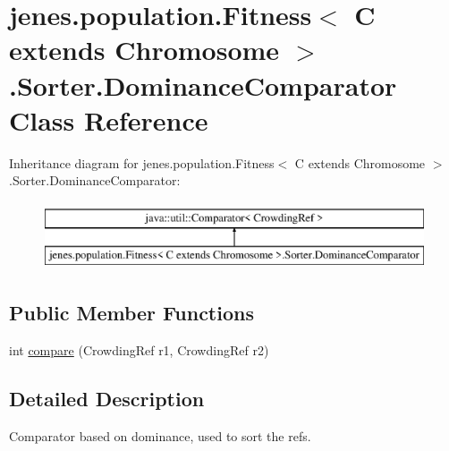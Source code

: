 \hypertarget{classjenes_1_1population_1_1_fitness_3_01_c_01extends_01_chromosome_01_4_1_1_sorter_1_1_dominance_comparator}{\section{jenes.\-population.\-Fitness$<$ C extends Chromosome $>$.Sorter.\-Dominance\-Comparator Class Reference}
\label{classjenes_1_1population_1_1_fitness_3_01_c_01extends_01_chromosome_01_4_1_1_sorter_1_1_dominance_comparator}
}
Inheritance diagram for jenes.\-population.\-Fitness$<$ C extends Chromosome $>$.Sorter.\-Dominance\-Comparator\-:\begin{figure}[H]
\begin{center}
\leavevmode
\includegraphics[height=2.000000cm]{classjenes_1_1population_1_1_fitness_3_01_c_01extends_01_chromosome_01_4_1_1_sorter_1_1_dominance_comparator}
\end{center}
\end{figure}
\subsection*{Public Member Functions}
\begin{DoxyCompactItemize}
\item 
int \hyperlink{classjenes_1_1population_1_1_fitness_3_01_c_01extends_01_chromosome_01_4_1_1_sorter_1_1_dominance_comparator_a208444cca048f82b54f7786df5dca788}{compare} (Crowding\-Ref r1, Crowding\-Ref r2)
\end{DoxyCompactItemize}


\subsection{Detailed Description}
Comparator based on dominance, used to sort the refs. 

